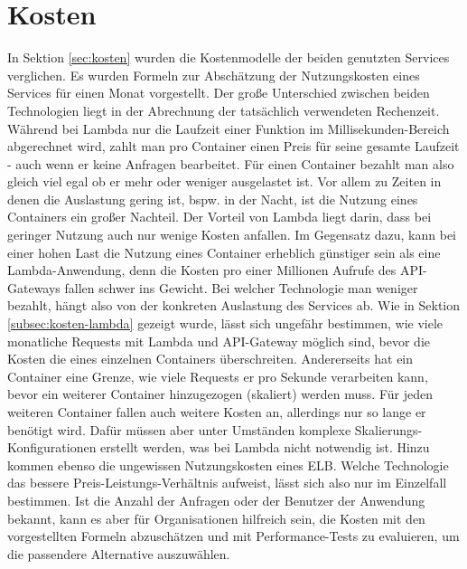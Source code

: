 \section{Kosten}
In Sektion \ref{sec:kosten} wurden die Kostenmodelle der beiden genutzten Services verglichen. Es wurden Formeln zur Abschätzung der Nutzungskosten eines Services für einen Monat vorgestellt. Der große Unterschied zwischen beiden Technologien liegt in der Abrechnung der tatsächlich verwendeten Rechenzeit. Während bei Lambda nur die Laufzeit einer Funktion im Millisekunden-Bereich abgerechnet wird, zahlt man pro Container einen Preis für seine gesamte Laufzeit - auch wenn er keine Anfragen bearbeitet. Für einen Container bezahlt man also gleich viel egal ob er mehr oder weniger ausgelastet ist. Vor allem zu Zeiten in denen die Auslastung gering ist, bspw. in der Nacht, ist die Nutzung eines Containers ein großer Nachteil. Der Vorteil von Lambda liegt darin, dass bei geringer Nutzung auch nur wenige Kosten anfallen. 
Im Gegensatz dazu, kann bei einer hohen Last die Nutzung eines Container erheblich günstiger sein als eine Lambda-Anwendung, denn die Kosten pro einer Millionen Aufrufe des API-Gateways fallen schwer ins Gewicht. Bei welcher Technologie man weniger bezahlt, hängt also von der konkreten Auslastung des Services ab. Wie in Sektion \ref{subsec:kosten-lambda} gezeigt wurde, lässt sich ungefähr bestimmen, wie viele monatliche Requests mit Lambda und API-Gateway möglich sind, bevor die Kosten die eines einzelnen Containers überschreiten. Andererseits hat ein Container eine Grenze, wie viele Requests er pro Sekunde verarbeiten kann, bevor ein weiterer Container hinzugezogen (skaliert) werden muss. Für jeden weiteren Container fallen auch weitere Kosten an, allerdings nur so lange er benötigt wird. Dafür müssen aber unter Umständen komplexe Skalierungs-Konfigurationen erstellt werden, was bei Lambda nicht notwendig ist. Hinzu kommen ebenso die ungewissen Nutzungskosten eines \ac{ELB}. Welche Technologie das bessere Preis-Leistungs-Verhältnis aufweist, lässt sich also nur im Einzelfall bestimmen. Ist die Anzahl der Anfragen oder der Benutzer der Anwendung bekannt, kann es aber für Organisationen hilfreich sein, die Kosten mit den vorgestellten Formeln abzuschätzen und mit Performance-Tests zu evaluieren, um die passendere Alternative auszuwählen. 

